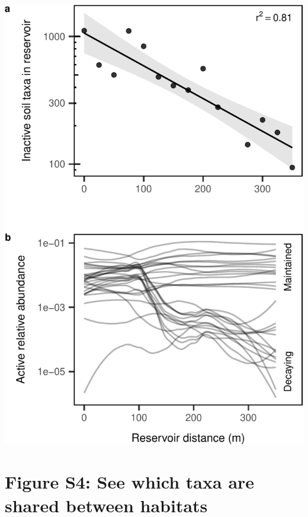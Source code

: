 \documentclass[]{article}
\begin{document}
\begin{center}\includegraphics{ReservoirGradient_files/figure-latex/fate_panel-1} \end{center}

\hypertarget{figure-s4-see-which-taxa-are-shared-between-habitats}{%
\section{Figure S4: See which taxa are shared between
habitats}\label{figure-s4-see-which-taxa-are-shared-between-habitats}}
\end{document}
